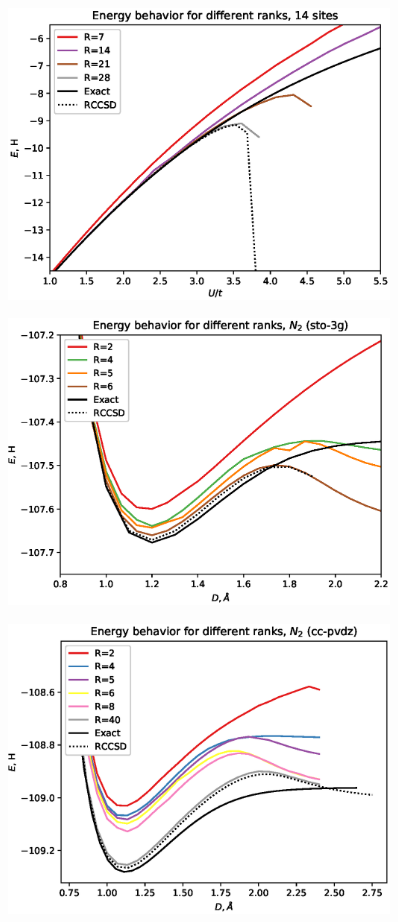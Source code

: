 \documentclass[a4paper,10pt]{article}
\begin{document}
\begin{figure}[!htb]
\centering
\includegraphics[width=0.9\textwidth]{figures/energy_vs_u_14_sites.eps}
\end{figure}

\begin{figure}[!htb]
\centering
\includegraphics[width=0.9\textwidth]{figures/energy_vs_d_sto-3g.eps}
\end{figure}

\begin{figure}[!htb]
\centering
\includegraphics[width=0.9\textwidth]{figures/energy_vs_d_cc-pvdz.eps}
\end{figure}
\end{document}
